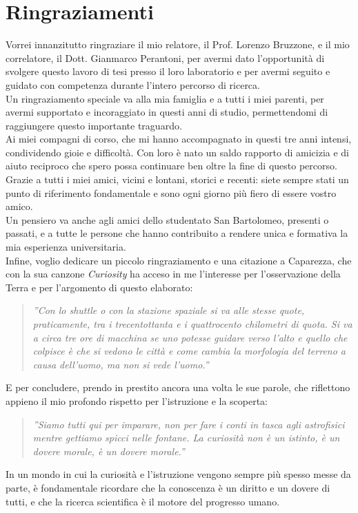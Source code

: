 \chapter*{Ringraziamenti}
\thispagestyle{empty}

Vorrei innanzitutto ringraziare il mio relatore, il Prof. Lorenzo Bruzzone, e il mio correlatore,
il Dott. Gianmarco Perantoni, per avermi dato l'opportunità di svolgere questo lavoro di tesi presso
il loro laboratorio e per avermi seguito e guidato con competenza durante l'intero percorso di ricerca.\\

Un ringraziamento speciale va alla mia famiglia e a tutti i miei parenti, per avermi supportato e
incoraggiato in questi anni di studio, permettendomi di raggiungere questo importante traguardo.\\

Ai miei compagni di corso, che mi hanno accompagnato in questi tre anni intensi, condividendo gioie e difficoltà.
Con loro è nato un saldo rapporto di amicizia e di aiuto reciproco che spero possa continuare ben oltre la fine di questo percorso.\\

Grazie a tutti i miei amici, vicini e lontani, storici e recenti: siete sempre stati un punto di
riferimento fondamentale e sono ogni giorno più fiero di essere vostro amico.\\

Un pensiero va anche agli amici dello studentato San Bartolomeo, presenti o passati, e a tutte le
persone che hanno contribuito a rendere unica e formativa la mia esperienza universitaria.\\

Infine, voglio dedicare un piccolo ringraziamento e una citazione a Caparezza,
che con la sua canzone \textit{Curiosity} ha acceso in me l'interesse per l'osservazione della Terra e per l'argomento di questo elaborato:

\begin{quote}
  \textit{
    ''Con lo shuttle o con la stazione spaziale si va alle stesse quote, praticamente,
    tra i trecentottanta e i quattrocento chilometri di quota.
    Si va a circa tre ore di macchina se uno potesse guidare verso l'alto e quello che
    colpisce è che si vedono le città e come cambia la morfologia del terreno a causa dell'uomo, ma non si vede l'uomo.''
  }
\end{quote}

E per concludere, prendo in prestito ancora una volta le sue parole, che riflettono appieno il mio profondo rispetto per l'istruzione e la scoperta:

\begin{quote}
  \textit{
    ''Siamo tutti qui per imparare, non per fare i conti in tasca agli astrofisici mentre gettiamo spicci nelle fontane.
    La curiosità non è un istinto, è un dovere morale, è un dovere morale.''
  }
\end{quote}

In un mondo in cui la curiosità e l'istruzione vengono sempre più spesso messe da parte,
è fondamentale ricordare che la conoscenza è un diritto e un dovere di tutti,
e che la ricerca scientifica è il motore del progresso umano.